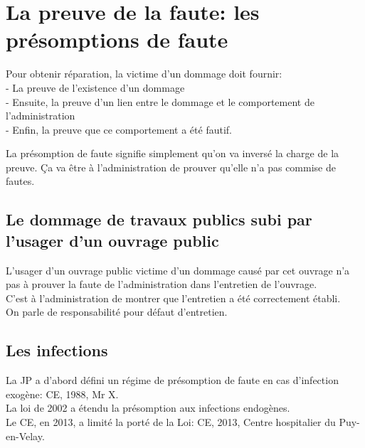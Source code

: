\documentclass[10pt, a4paper, openany]{book}
\begin{document}
\section{La preuve de la faute: les présomptions de faute}

Pour obtenir réparation, la victime d'un dommage doit fournir: \\
- La preuve de l'existence d'un dommage \\
- Ensuite, la preuve d'un lien entre le dommage et le comportement de l'administration \\
- Enfin, la preuve que ce comportement a été fautif. 


La présomption de faute signifie simplement qu'on va inversé la charge de la preuve. Ça va être à l'administration de prouver qu'elle n'a pas commise de fautes. 

\subsection{Le dommage de travaux publics subi par l'usager d'un ouvrage public}

L'usager d'un ouvrage public victime d'un dommage causé par cet ouvrage n'a pas à prouver la faute de l'administration dans l'entretien de l'ouvrage. \\
C'est à l'administration de montrer que l'entretien a été correctement établi.\\
On parle de responsabilité pour défaut d'entretien.


\subsection{Les infections}

La JP a d'abord défini un régime de présomption de faute en cas d'infection exogène: CE, 1988, Mr X.\\
La loi de 2002 a étendu la présomption aux infections endogènes. \\
Le CE, en 2013, a limité la porté de la Loi: CE, 2013, Centre hospitalier du Puy-en-Velay.  
\end{document}
